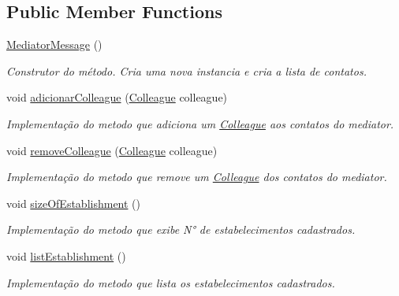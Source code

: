 \subsection*{Public Member Functions}
\begin{DoxyCompactItemize}
\item 
\mbox{\hyperlink{classmediator_pattern_1_1_mediator_message_aab9ae2245a91cbd0d7c7b030da230bce}{Mediator\+Message}} ()
\begin{DoxyCompactList}\small\item\em Construtor do método. Cria uma nova instancia e cria a lista de contatos. \end{DoxyCompactList}\item 
void \mbox{\hyperlink{classmediator_pattern_1_1_mediator_message_ab90489c21ee0b6ac6cfd31485a1ab627}{adicionar\+Colleague}} (\mbox{\hyperlink{classmediator_pattern_1_1_colleague}{Colleague}} colleague)
\begin{DoxyCompactList}\small\item\em Implementação do metodo que adiciona um \mbox{\hyperlink{classmediator_pattern_1_1_colleague}{Colleague}} aos contatos do mediator. \end{DoxyCompactList}\item 
void \mbox{\hyperlink{classmediator_pattern_1_1_mediator_message_a24da9666fc7c515b4b1ae19315f44e9c}{remove\+Colleague}} (\mbox{\hyperlink{classmediator_pattern_1_1_colleague}{Colleague}} colleague)
\begin{DoxyCompactList}\small\item\em Implementação do metodo que remove um \mbox{\hyperlink{classmediator_pattern_1_1_colleague}{Colleague}} dos contatos do mediator. \end{DoxyCompactList}\item 
void \mbox{\hyperlink{classmediator_pattern_1_1_mediator_message_a2c346974e11a4d9e5d6d7322dfd86d62}{size\+Of\+Establishment}} ()
\begin{DoxyCompactList}\small\item\em Implementação do metodo que exibe N° de estabelecimentos cadastrados. \end{DoxyCompactList}\item 
void \mbox{\hyperlink{classmediator_pattern_1_1_mediator_message_ad6d32392f6443c3024ef6917ba5abd86}{list\+Establishment}} ()
\begin{DoxyCompactList}\small\item\em Implementação do metodo que lista os estabelecimentos cadastrados. \end{DoxyCompactList}\item 

\end{DoxyCompactItemize}
